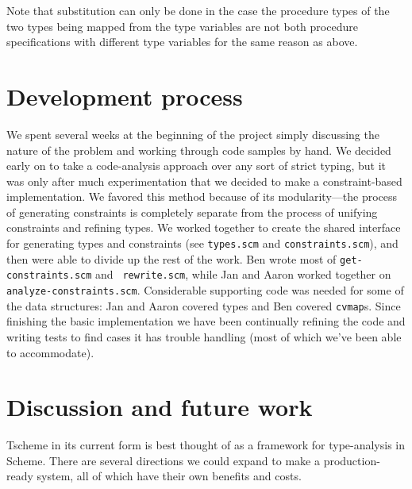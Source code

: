 \documentclass[a4paper]{article}
\newcommand{\T}[1]{\texttt{#1}}
\begin{document}
Note that substitution can only be done in the case the procedure types
of the two types being mapped from the type variables are not both procedure specifications
with different type variables for the same reason as above.

\section{Development process}

We spent several weeks at the beginning of the project simply discussing the 
nature of the problem and working through code samples by hand.  We decided 
early on to take a code-analysis approach over any sort of strict typing, but 
it was only after much experimentation that we decided to make a 
constraint-based implementation.  We favored this method because of its 
modularity---the process of generating constraints is completely separate from 
the process of unifying constraints and refining types.  We worked together to 
create the shared interface for generating types and constraints
(see {\tt types.scm} and {\tt constraints.scm}), and then were able to divide 
up the rest of the work.  Ben wrote most of {\tt get-constraints.scm} and {\tt
rewrite.scm}, while Jan and Aaron worked together on {\tt
analyze-constraints.scm}.  Considerable supporting code was needed for some of
the data structures: Jan and Aaron covered types and Ben covered \T{cvmap}s.
Since finishing the basic implementation we have been continually refining the
code and writing tests to find cases it has trouble handling (most of which
we've been able to accommodate).

\section{Discussion and future work}

Tscheme in its current form is best thought of as a framework for 
type-analysis in Scheme.  There are several directions we could expand to make 
a production-ready system, all of which have their own benefits and costs.
\end{document}
